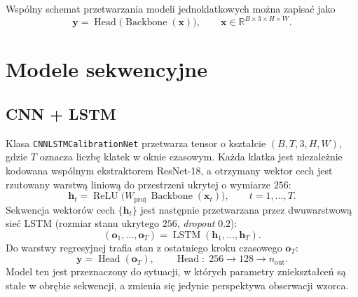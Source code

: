 \documentclass[12pt,a4paper]{report}
\begin{document}
Wspólny schemat przetwarzania modeli jednoklatkowych można zapisać jako
\begin{equation}
  \mathbf{y} = \operatorname{Head}\big(\operatorname{Backbone}(\mathbf{x})\big),
  \qquad \mathbf{x} \in \mathbb{R}^{B \times 3 \times H \times W}.
\end{equation}

\section{Modele sekwencyjne}

\subsection{CNN + LSTM}
Klasa \texttt{CNNLSTMCalibrationNet} przetwarza tensor o kształcie
$(B, T, 3, H, W)$, gdzie $T$ oznacza liczbę klatek w oknie czasowym. Każda klatka jest
niezależnie kodowana wspólnym ekstraktorem ResNet-18, a otrzymany wektor cech jest
rzutowany warstwą liniową do przestrzeni ukrytej o wymiarze $256$:
\begin{equation}
  \mathbf{h}_t = \operatorname{ReLU}\!\big(W_{\text{proj}}\,\operatorname{Backbone}(\mathbf{x}_t)\big),
  \qquad t = 1, \dots, T .
\end{equation}
Sekwencja wektorów cech $\{\mathbf{h}_t\}$ jest następnie przetwarzana przez
dwuwarstwową sieć LSTM (rozmiar stanu ukrytego $256$, \emph{dropout} $0.2$):
\begin{equation}
  (\mathbf{o}_1, \dots, \mathbf{o}_T) = \operatorname{LSTM}(\mathbf{h}_1, \dots, \mathbf{h}_T).
\end{equation}
Do warstwy regresyjnej trafia stan z ostatniego kroku czasowego $\mathbf{o}_T$:
\begin{equation}
  \mathbf{y} = \operatorname{Head}(\mathbf{o}_T),
  \qquad \operatorname{Head}:\; 256 \to 128 \to n_{\text{out}} .
\end{equation}
Model ten jest przeznaczony do sytuacji, w których parametry zniekształceń są stałe w
obrębie sekwencji, a zmienia się jedynie perspektywa obserwacji wzorca.
\end{document}
